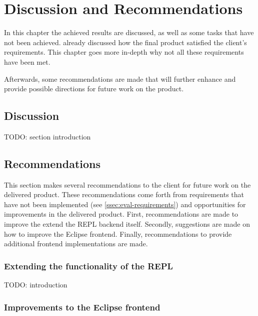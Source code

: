 \chapter{Discussion and Recommendations}
\label{cha:disc-recomm}

In this chapter the achieved results are discussed, as well as some tasks that
have not been achieved.  already discussed how the final
product satisfied the client's requirements. This chapter goes more in-depth why
not all these requirements have been met.

Afterwards, some recommendations are made that will further enhance and provide
possible directions for future work on the product.

\section{Discussion}
\label{sec:discuss-discussion}

TODO: section introduction



%

\section{Recommendations}
\label{sec:discuss-future}

This section makes several recommendations to the client for future work on the
delivered product. These recommendations come forth from requirements that have
not been implemented (see \cref{ssec:eval-requirements}) and opportunities for
improvements in the delivered product. First, recommendations are made to
improve the extend the REPL backend itself. Secondly, suggestions are made on
how to improve the Eclipse frontend. Finally, recommendations to provide
additional frontend implementations are made.

\subsection{Extending the functionality of the REPL}
\label{ssec:impr-backend}

TODO: introduction





\subsection{Improvements to the Eclipse frontend}
\label{ssec:impr-eclipse}

